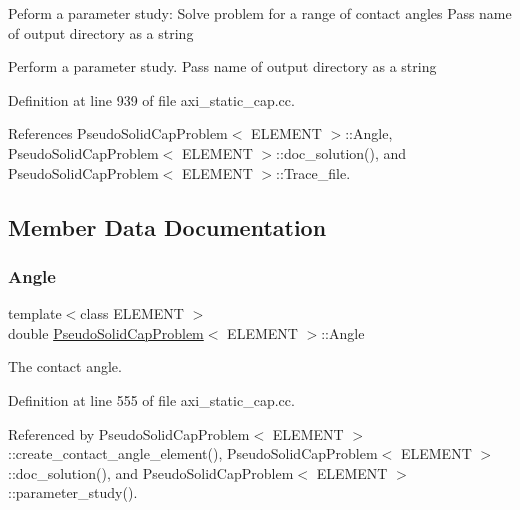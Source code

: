 Peform a parameter study\+: Solve problem for a range of contact angles Pass name of output directory as a string

Perform a parameter study. Pass name of output directory as a string 

Definition at line 939 of file axi\+\_\+static\+\_\+cap.\+cc.



References Pseudo\+Solid\+Cap\+Problem$<$ E\+L\+E\+M\+E\+N\+T $>$\+::\+Angle, Pseudo\+Solid\+Cap\+Problem$<$ E\+L\+E\+M\+E\+N\+T $>$\+::doc\+\_\+solution(), and Pseudo\+Solid\+Cap\+Problem$<$ E\+L\+E\+M\+E\+N\+T $>$\+::\+Trace\+\_\+file.



\subsection{Member Data Documentation}
\mbox{\label{classPseudoSolidCapProblem_a51dfbd14a2cca78dc0efe6740337a22b}} 
\subsubsection{\texorpdfstring{Angle}{Angle}}
{\footnotesize\ttfamily template$<$class E\+L\+E\+M\+E\+NT $>$ \\
double \hyperlink{classPseudoSolidCapProblem}{Pseudo\+Solid\+Cap\+Problem}$<$ E\+L\+E\+M\+E\+NT $>$\+::Angle\hspace{0.3cm}{\ttfamily [private]}}



The contact angle. 



Definition at line 555 of file axi\+\_\+static\+\_\+cap.\+cc.



Referenced by Pseudo\+Solid\+Cap\+Problem$<$ E\+L\+E\+M\+E\+N\+T $>$\+::create\+\_\+contact\+\_\+angle\+\_\+element(), Pseudo\+Solid\+Cap\+Problem$<$ E\+L\+E\+M\+E\+N\+T $>$\+::doc\+\_\+solution(), and Pseudo\+Solid\+Cap\+Problem$<$ E\+L\+E\+M\+E\+N\+T $>$\+::parameter\+\_\+study().

\mbox{\label{classPseudoSolidCapProblem_a6d4520b30d05f3dde12ea9bae9d62d0b}} 
